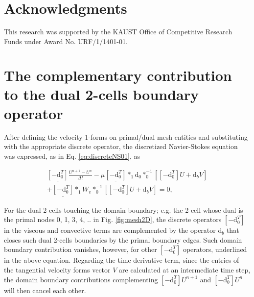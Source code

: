 \documentclass[final,12pt,times]{elsarticle}
\begin{document}
\section*{Acknowledgments}

This research was supported by the KAUST Office of Competitive Research Funds under Award No. URF/1/1401-01.


\appendix

\section{The complementary contribution to the dual 2-cells boundary operator}
\label{app:boundary-operator}

After defining the velocity 1-forms on primal/dual mesh entities and substituting with the appropriate discrete operator, the discretized Navier-Stokes equation was expressed, as in Eq. \eqref{eq:discreteNS01}, as  

\begin{multline}
\label{eq:discreteNS01-app}
\underline{[-\textrm{d}^T_0]} \frac{U^{n+1} - U^n}{\Delta t} - \mu \underline{[-\textrm{d}^T_0]} \ast_1 \textrm{d}_0 \ast^{-1}_0 \left[[-\textrm{d}^T_0] U + \textrm{d}_b V \right] \\ +  \underline{[-\textrm{d}^T_0]} \ast_1 W_v \ast^{-1}_0 \left[[-\textrm{d}^T_0] U + \textrm{d}_b V\right] =0, 
\end{multline}

For the dual 2-cells touching the domain boundary; e.g. the 2-cell whose dual is the primal nodes 0, 1, 3, 4, .. in Fig. \ref{fig:mesh2D}, the discrete operators $[-\textrm{d}^T_0]$ in the viscous and convective terms are complemented by the operator $\textrm{d}_b$ that closes such dual 2-cells boundaries by the primal boundary edges. Such domain boundary contribution vanishes, however, for other $[-\textrm{d}^T_0]$ operators, underlined in the above equation. Regarding the time derivative term, since the entries of the tangential velocity forms vector $V$ are calculated at an intermediate time step, the domain boundary contributions complementing $[-\textrm{d}^T_0] U^{n+1}$ and $[-\textrm{d}^T_0] U^n$ will then cancel each other.
\end{document}
